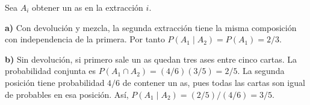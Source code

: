 Sea $A_i$ obtener un as en la extracción $i$.

\textbf{a)} Con devolución y mezcla, la segunda extracción
tiene la misma composición con independencia de la primera.
Por tanto $P(A_1\mid A_2)=P(A_1)=\boxed{2/3}$.

\textbf{b)} Sin devolución, si primero sale un as quedan tres
ases entre cinco cartas. La probabilidad conjunta es
$P(A_1\cap A_2)=(4/6)(3/5)=2/5$. La segunda posición tiene
probabilidad $4/6$ de contener un as, pues todas las cartas
son igual de probables en esa posición. Así,
$P(A_1\mid A_2)=(2/5)/(4/6)=\boxed{3/5}$.
